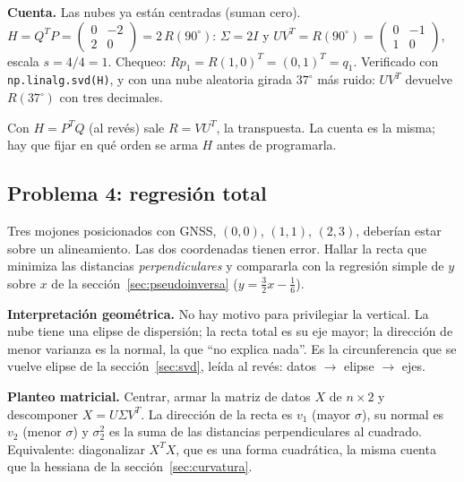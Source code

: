 \textbf{Cuenta.} Las nubes ya están centradas (suman cero).
\(H=Q^TP=\begin{pmatrix}0&-2\\2&0\end{pmatrix}=2\,R(90^\circ)\): \(\Sigma=2I\) y
\(UV^T=R(90^\circ)=\begin{pmatrix}0&-1\\1&0\end{pmatrix}\), escala
\(s=4/4=1\). Chequeo: \(Rp_1=R(1,0)^T=(0,1)^T=q_1\). Verificado con
\texttt{np.linalg.svd(H)}, y con una nube aleatoria girada \(37^\circ\) más ruido:
\(UV^T\) devuelve \(R(37^\circ)\) con tres decimales.

\begin{atencion}[Convención de \(H\)]
Con \(H=P^TQ\) (al revés) sale \(R=VU^T\), la transpuesta. La cuenta es la misma; hay
que fijar en qué orden se arma \(H\) antes de programarla.
\end{atencion}

\subsection{Problema 4: regresión total}

\begin{enunciado}[Enunciado]
Tres mojones posicionados con GNSS, \((0,0)\), \((1,1)\), \((2,3)\), deberían estar sobre
un alineamiento. Las dos coordenadas tienen error. Hallar la recta que minimiza las
distancias \emph{perpendiculares} y compararla con la regresión simple de \(y\) sobre
\(x\) de la sección~\ref{sec:pseudoinversa} (\(y=\tfrac32x-\tfrac16\)).
\end{enunciado}

\textbf{Interpretación geométrica.} No hay motivo para privilegiar la vertical. La nube
tiene una elipse de dispersión; la recta total es su eje mayor; la dirección de menor
varianza es la normal, la que ``no explica nada''. Es la circunferencia que se vuelve
elipse de la sección~\ref{sec:svd}, leída al revés: datos \(\to\) elipse \(\to\) ejes.

\textbf{Planteo matricial.} Centrar, armar la matriz de datos \(X\) de \(n\times2\) y
descomponer \(X=U\Sigma V^T\). La dirección de la recta es \(v_1\) (mayor \(\sigma\)), su
normal es \(v_2\) (menor \(\sigma\)) y \(\sigma_2^2\) es la suma de las distancias
perpendiculares al cuadrado. Equivalente: diagonalizar \(X^TX\), que es una forma
cuadrática, la misma cuenta que la hessiana de la sección~\ref{sec:curvatura}.

